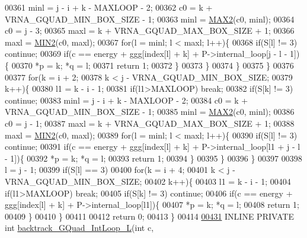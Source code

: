 \begin{DoxyCode}
00361       minl  = j - i + k - MAXLOOP - 2;
00362       c0    = k + VRNA\_GQUAD\_MIN\_BOX\_SIZE - 1;
00363       minl  = \hyperlink{group__utils_ga33297b3679c713b0c4d897cd0fe3b122}{MAX2}(c0, minl);
00364       c0    = j - 3;
00365       maxl  = k + VRNA\_GQUAD\_MAX\_BOX\_SIZE + 1;
00366       maxl  = \hyperlink{group__utils_gae0b9cd0ce090bd69b951aa73e8fa4f7d}{MIN2}(c0, maxl);
00367       \textcolor{keywordflow}{for}(l = minl; l < maxl; l++)\{
00368         \textcolor{keywordflow}{if}(S[l] != 3) \textcolor{keywordflow}{continue};
00369         \textcolor{keywordflow}{if}(c == energy + ggg[index[l] + k] + P->internal\_loop[j - l - 1])\{
00370           *p = k; *q = l;
00371           \textcolor{keywordflow}{return} 1;
00372         \}
00373       \}
00374     \}
00375   \}
00376 
00377   \textcolor{keywordflow}{for}(k = i + 2;
00378       k < j - VRNA\_GQUAD\_MIN\_BOX\_SIZE;
00379       k++)\{
00380     l1    = k - i - 1;
00381     \textcolor{keywordflow}{if}(l1>MAXLOOP) \textcolor{keywordflow}{break};
00382     \textcolor{keywordflow}{if}(S[k] != 3) \textcolor{keywordflow}{continue};
00383     minl  = j - i + k - MAXLOOP - 2;
00384     c0    = k + VRNA\_GQUAD\_MIN\_BOX\_SIZE - 1;
00385     minl  = \hyperlink{group__utils_ga33297b3679c713b0c4d897cd0fe3b122}{MAX2}(c0, minl);
00386     c0    = j - 1;
00387     maxl  = k + VRNA\_GQUAD\_MAX\_BOX\_SIZE + 1;
00388     maxl  = \hyperlink{group__utils_gae0b9cd0ce090bd69b951aa73e8fa4f7d}{MIN2}(c0, maxl);
00389     \textcolor{keywordflow}{for}(l = minl; l < maxl; l++)\{
00390       \textcolor{keywordflow}{if}(S[l] != 3) \textcolor{keywordflow}{continue};
00391       \textcolor{keywordflow}{if}(c == energy + ggg[index[l] + k] + P->internal\_loop[l1 + j - l - 1])\{
00392         *p = k; *q = l;
00393         \textcolor{keywordflow}{return} 1;
00394       \}
00395     \}
00396   \}
00397 
00398   l = j - 1;
00399   \textcolor{keywordflow}{if}(S[l] == 3)
00400     \textcolor{keywordflow}{for}(k = i + 4;
00401         k < j - VRNA\_GQUAD\_MIN\_BOX\_SIZE;
00402         k++)\{
00403       l1    = k - i - 1;
00404       \textcolor{keywordflow}{if}(l1>MAXLOOP) \textcolor{keywordflow}{break};
00405       \textcolor{keywordflow}{if}(S[k] != 3) \textcolor{keywordflow}{continue};
00406       \textcolor{keywordflow}{if}(c == energy + ggg[index[l] + k] + P->internal\_loop[l1])\{
00407         *p = k; *q = l;
00408         \textcolor{keywordflow}{return} 1;
00409       \}
00410     \}
00411 
00412   \textcolor{keywordflow}{return} 0;
00413 \}
00414 
\hypertarget{gquad_8h_source_l00431}{}\hyperlink{group__loops_ga7b371308fa5a45c7ac353ef6ed1014de}{00431} INLINE  PRIVATE \textcolor{keywordtype}{int} \hyperlink{group__loops_ga7b371308fa5a45c7ac353ef6ed1014de}{backtrack\_GQuad\_IntLoop\_L}(\textcolor{keywordtype}{int} c,

\end{DoxyCode}
